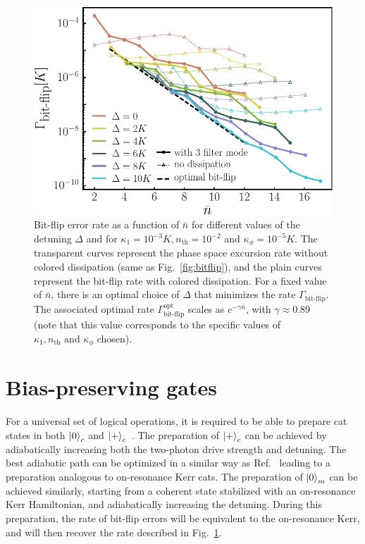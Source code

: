 \documentclass[%
 reprint,
 superscriptaddress,
 amsmath,
 amssymb,
 aps,
 pra,
 10pt
]{revtex4-2}
\newcommand{\nbar}{\bar{n}}
\begin{document}
\begin{figure}[t!]
    \includegraphics[width=\columnwidth]{image/Color_Bitflip_V2.pdf}
    \vspace{-0.5cm}
    \caption{\label{fig:coloredbitflip} 
    Bit-flip error rate as a function of $\nbar$ for different values of the detuning $\Delta$ and for $\kappa_1 = 10^{-3}K, n_{\text{th}}=10^{-2}$ and $\kappa_\phi = 10^{-5}K$. The transparent curves represent the phase space excursion rate without colored dissipation (same as Fig.~\ref{fig:bitflip}), and the plain curves represent the bit-flip rate with colored dissipation. For a fixed value of $\bar n$, there is an optimal choice of $\Delta$ that minimizes the rate $\Gamma_\text{bit-flip}$. The associated optimal rate $\Gamma^{\text{opt}}_\text{bit-flip}$ scales as $e^{-\gamma\bar n}$, with $\gamma\approx 0.89$ (note that this value corresponds to the specific values of $\kappa_1,n_{\text{th}} \text{ and } \kappa_\phi$ chosen).
    }
\end{figure}

\section{\label{sec:level6}Bias-preserving gates}

For a universal set of logical operations, it is required to be able to prepare cat states in both $\ket{0}_c$ and $\ket{+}_c$~\cite{Guillaud2019}. The preparation of $\ket{+}_c$ can be achieved by adiabatically increasing both the two-photon drive strength and detuning. The best adiabatic path can be optimized in a similar way as Ref.~\cite{Yanagimoto2019} leading to a preparation analogous to on-resonance Kerr cats. The preparation of $\ket{0}_m$ can be achieved similarly, starting from a coherent state stabilized with an on-resonance Kerr Hamiltonian, and adiabatically increasing the detuning. During this preparation, the rate of bit-flip errors will be equivalent to the on-resonance Kerr, and will then recover the rate described in Fig.~\ref{fig:coloredbitflip}.
\end{document}
